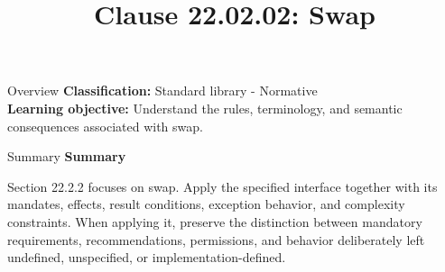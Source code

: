 \documentclass[10pt,letterpaper]{article}
\title{Clause 22.02.02: Swap}
\author{}
\date{}
\begin{document}
\maketitle
\begin{CornellOverviewBox}{Overview}
\textbf{Classification:} Standard library - Normative\\[2pt]
\textbf{Learning objective:} Understand the rules, terminology, and semantic consequences associated with swap.
\end{CornellOverviewBox}\begin{CornellSummaryBox}{Summary}
{\sffamily\bfseries\color{Accent} Summary}\par\vspace{3pt}Section 22.2.2 focuses on swap. Apply the specified interface together with its mandates, effects, result conditions, exception behavior, and complexity constraints. When applying it, preserve the distinction between mandatory requirements, recommendations, permissions, and behavior deliberately left undefined, unspecified, or implementation-defined.
\end{CornellSummaryBox}
\end{document}
